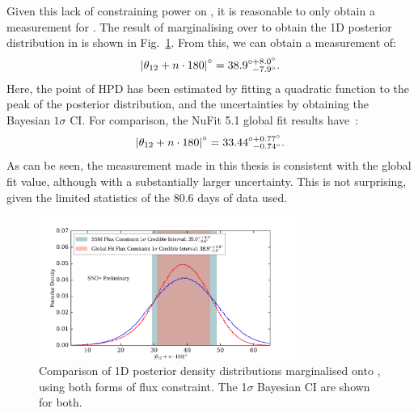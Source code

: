 Given this lack of constraining power on \dmsq{}, it is reasonable to only obtain a measurement for \tonetwo{}. The result of marginalising over \dmsq{} to obtain the 1D posterior distribution in \tonetwo{} is shown in Fig.~\ref{fig:1d_theta_12_posterior}. From this, we can obtain a measurement of:
\begin{equation*}
    \left|\theta_{12}{} + n\cdot180\right|^{\circ} = 38.9^{\circ+8.0^{\circ}}_{\phantom{\circ}-7.9^{\circ}}.
\end{equation*}
Here, the point of HPD has been estimated by fitting a quadratic function to the peak of the posterior distribution, and the uncertainties by obtaining the Bayesian $1\sigma$ CI. For comparison, the NuFit 5.1 global fit results have~\cite{estebanFateHintsUpdated2020}: %
\begin{equation*}
    \left|\theta_{12}{} + n\cdot180\right|^{\circ} = 33.44^{\circ+0.77^{\circ}}_{\phantom{\circ}-0.74^{\circ}}.
\end{equation*}
As can be seen, the measurement made in this thesis is consistent with the global fit value, although with a substantially larger uncertainty. This is not surprising, given the limited statistics of the 80.6 days of data used.

\begin{figure}
    \centering
    \includegraphics[width=0.75\textwidth]{6_SolarAnalysis/images/theta_12_comparison_flux_constraint_corrected_tagging_2_mobins.pdf}
    \caption[Comparison of 1D posterior density distribution marginalised onto \tonetwo{} for different flux constraints]
    {Comparison of 1D posterior density distributions marginalised onto \tonetwo{}, using both forms of \beight{} flux constraint. The 1$\sigma$ Bayesian CI are shown for both.}
    \label{fig:1d_theta_12_posterior}
\end{figure}

